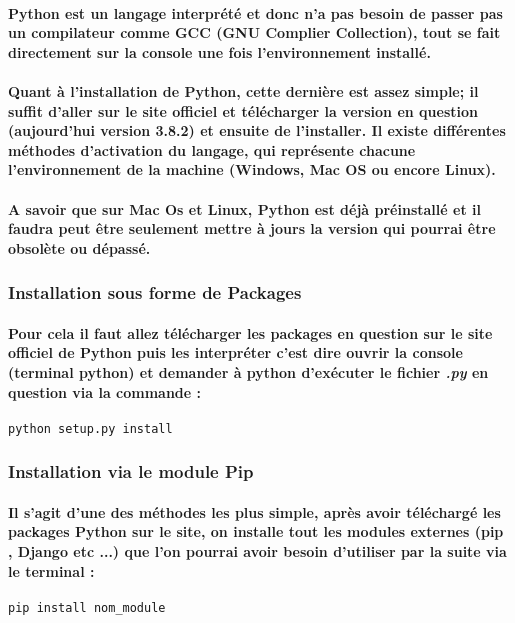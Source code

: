 \documentclass[a4paper, 12pt, twoside]{article}
\begin{document}
\paragraph{Python est un langage interprété et donc n'a pas besoin de passer pas un compilateur comme GCC (GNU Complier Collection), tout se fait directement sur la console une fois l'environnement installé.}
\paragraph{Quant à l'installation de Python, cette dernière est assez simple; il suffit d'aller sur le site officiel et télécharger la version en question (aujourd'hui version 3.8.2) et ensuite de l'installer. Il existe différentes méthodes d'activation du langage, qui représente chacune l'environnement de la machine (Windows, Mac OS ou encore Linux).}
\paragraph{A savoir que sur Mac Os et Linux, Python est déjà préinstallé et il faudra peut être seulement mettre à jours la version qui pourrai être obsolète ou dépassé.}

\subsubsection{Installation sous forme de Packages} 
\paragraph{Pour cela il faut allez télécharger les packages en question sur le site officiel de Python puis les interpréter c'est dire ouvrir la console (terminal python) et demander à python d'exécuter le fichier \textit{.py} en question via la commande :}
\begin{verbatim}
python setup.py install
\end{verbatim} 

\subsubsection{Installation via le module Pip} 
\paragraph{Il s'agit d'une des méthodes les plus simple, après avoir téléchargé les packages Python sur le site, on installe tout les modules externes (pip , Django etc ...)  que l'on pourrai avoir besoin d'utiliser par la suite via le terminal : }
\begin{verbatim}
pip install nom_module
\end{verbatim}
\end{document}
